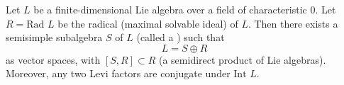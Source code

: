 Let $L$ be a finite-dimensional Lie algebra over a field of characteristic 0. Let $R = \text{Rad } L$ be the radical (maximal solvable ideal) of $L$. Then there exists a semisimple subalgebra $S$ of $L$ (called a ) such that
$$L = S \oplus R$$
as vector spaces, with $[S, R] \subset R$ (a semidirect product of Lie algebras). Moreover, any two Levi factors are conjugate under $\text{Int } L$.
